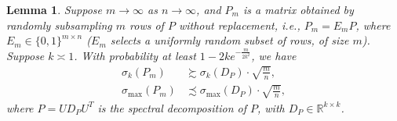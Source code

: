 \documentclass{article}
\newtheorem{lemma}{Lemma}
\newcommand{\real}{\mathbb{R}}
\begin{document}
\begin{lemma}
\label{LemSubsampleSigma}
Suppose $m \rightarrow \infty$ as $n \rightarrow \infty$, and $P_m$ is a matrix obtained by randomly subsampling $m$ rows of $P$ without replacement, i.e., $P_m = E_mP$, where $E_m \in \{0, 1\}^{m \times n}$ ($E_m$ selects a uniformly random subset of rows, of size $m$). Suppose $k \asymp 1$.
With probability at least $1 - 2ke^{-\frac{m}{2k^2}}$, we have
\begin{align*}
    \sigma_{k}(P_m) & \succsim \sigma_{k}(D_P) \cdot \sqrt{\frac{m}{n}}, \\
    \sigma_{\max}(P_m) & \precsim \sigma_{\max}(D_P) \cdot \sqrt{\frac{m}{n}},
\end{align*}
where $P = UD_PU^T$ is the spectral decomposition of $P$, with $D_P \in \real^{k \times k}$.
\end{lemma}
\end{document}
